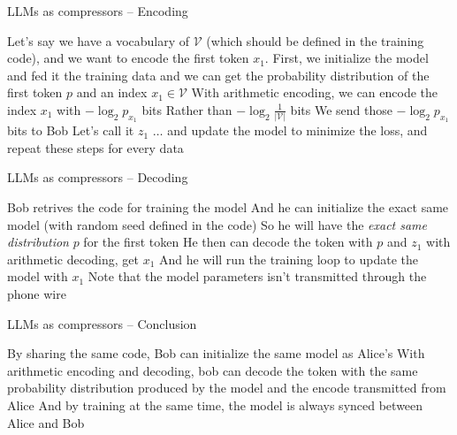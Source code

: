 \documentclass[scheme=plain]{ctexbeamer}
\begin{document}
\begin{frame}{LLMs as compressors -- Encoding}
  \begin{outline}
    \1 Let's say we have a vocabulary of \(\mathcal{V}\) (which should be defined in the training code), and we want to encode the first token \(x_1\).
    \pause
    \1 First, we initialize the model and fed it the training data
      \2 and we can get the probability distribution of the first token $p$ and an index $x_1 \in \mathcal{V}$
      \pause
    \1 With arithmetic encoding, we can encode the index $x_1$ with $-\log_2 p_{x_1}$ bits
      \2 Rather than $-\log_2 \frac{1}{|\mathcal{V}|}$ bits
      \pause
    \1 We send those $-\log_2 p_{x_1}$ bits to Bob
      \2 Let's call it $z_1$
      \pause
    \1 $\dots$ and update the model to minimize the loss, and repeat these steps for every data
  \end{outline}
\end{frame}

\begin{frame}{LLMs as compressors -- Decoding}
  \begin{outline}
    \1 Bob retrives the code for training the model
    \pause
    \1 And he can initialize the exact same model (with random seed defined in the code)
    \pause
    \1 So he will have the \emph{exact same distribution} $p$ for the first token
      \2 He then can decode the token with $p$ and $z_1$ with arithmetic decoding, get $x_1$
      \pause
    \1 And he will run the training loop to update the model with $x_1$
    \1 Note that the model parameters isn't transmitted through the phone wire
  \end{outline}
\end{frame}

\begin{frame}{LLMs as compressors -- Conclusion}
  \begin{outline}
    \1 By sharing the same code, Bob can initialize the same model as Alice's
    \1 With arithmetic encoding and decoding, bob can decode the token with the same probability distribution produced by the model and the encode transmitted from Alice
    \1 And by training at the same time, the model is always synced between Alice and Bob
  \end{outline}
\end{frame}
\end{document}
